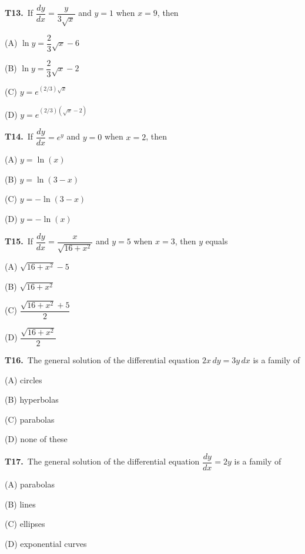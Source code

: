 \documentclass[11pt]{article}
\begin{document}
\bigskip\noindent\textbf{T13.}\ If $\dfrac{dy}{dx}=\dfrac{y}{3\sqrt{x}}$ and $y=1$ when $x=9$, then
\begin{list}{}{\setlength{\leftmargin}{3em}\setlength{\labelwidth}{2.5em}\setlength{\itemsep}{0pt}\setlength{\topsep}{2pt}}
\item[(A)] $\ln y = \dfrac{2}{3}\sqrt{x}-6$
\item[(B)] $\ln y = \dfrac{2}{3}\sqrt{x}-2$
\item[(C)] $y=e^{(2/3)\sqrt{x}}$
\item[(D)] $y=e^{(2/3)(\sqrt{x}-2)}$
\end{list}

\bigskip\noindent\textbf{T14.}\ If $\dfrac{dy}{dx}=e^y$ and $y=0$ when $x=2$, then
\begin{list}{}{\setlength{\leftmargin}{3em}\setlength{\labelwidth}{2.5em}\setlength{\itemsep}{0pt}\setlength{\topsep}{2pt}}
\item[(A)] $y=\ln(x)$
\item[(B)] $y=\ln(3-x)$
\item[(C)] $y=-\ln(3-x)$
\item[(D)] $y=-\ln(x)$
\end{list}

\bigskip\noindent\textbf{T15.}\ If $\dfrac{dy}{dx}=\dfrac{x}{\sqrt{16+x^2}}$ and $y=5$ when $x=3$, then $y$ equals
\begin{list}{}{\setlength{\leftmargin}{3em}\setlength{\labelwidth}{2.5em}\setlength{\itemsep}{0pt}\setlength{\topsep}{2pt}}
\item[(A)] $\sqrt{16+x^2}-5$
\item[(B)] $\sqrt{16+x^2}$
\item[(C)] $\dfrac{\sqrt{16+x^2}+5}{2}$
\item[(D)] $\dfrac{\sqrt{16+x^2}}{2}$
\end{list}

\bigskip\noindent\textbf{T16.}\ The general solution of the differential equation $2x\,dy=3y\,dx$ is a family of
\begin{list}{}{\setlength{\leftmargin}{3em}\setlength{\labelwidth}{2.5em}\setlength{\itemsep}{0pt}\setlength{\topsep}{2pt}}
\item[(A)] circles
\item[(B)] hyperbolas
\item[(C)] parabolas
\item[(D)] none of these
\end{list}

\bigskip\noindent\textbf{T17.}\ The general solution of the differential equation $\dfrac{dy}{dx}=2y$ is a family of
\begin{list}{}{\setlength{\leftmargin}{3em}\setlength{\labelwidth}{2.5em}\setlength{\itemsep}{0pt}\setlength{\topsep}{2pt}}
\item[(A)] parabolas
\item[(B)] lines
\item[(C)] ellipses
\item[(D)] exponential curves
\end{list}
\end{document}
